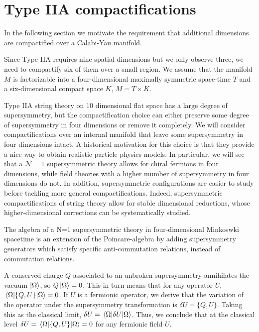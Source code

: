 \chapter{Type IIA compactifications}

In the following section we motivate the requirement that additional dimensions are compactified
over a Calabi-Yau manifold.

Since Type IIA requires nine spatial dimensions but we only observe three, we need to compactify six of 
them over a small region.
We assume that the manifold $M$ is factorizable into a four-dimensional maximally symmetric space-time $T$ and a six-dimensional compact space $K$,
$M =  T\times K$.

Type IIA string theory on 10 dimensional flat space has a large degree of supersymmetry,
but the compactification choice can either preserve some degree of supersymmetry in four dimensions or remove it completely.
We will consider compactifications over an internal manifold that leave some supersymmetry in four dimensions intact.
A historical motivation for this choice is that they provide a nice way to obtain realistic particle 
physics models. 
In particular, we will see that a $\mathcal N=1$ supersymmetric theory allows for chiral fermions in four dimensions, while field theories with a higher mumber of supersymmetry in four dimensions do not.
In addition, supersymmetric configurations are easier to study before tackling more general compactifications.
Indeed, supersymmetric compactifications of string theory allow  for stable dimensional reductions, whose higher-dimensional corrections can be systematically studied.

The algebra of a N=1 supersymmetric theory in four-dimensional Minkoswki spacetime is an extension of the Poincare-algebra by adding
 supersymmetry generators which satisfy specific anti-commutation relations, instead of commutation relations. 

A conserved charge $Q$ associated to an unbroken supersymmetry annihilates the vacuum $\ket{\Omega}$,
so $Q\ket{\Omega}=0$.
This in turn means that for any operator $U$, $\ev{ \{Q,U\} }{\Omega}=0$.
If $U$ is a fermionic operator, we derive that the variation of the operator under the supersymmetry
transformation is $\delta U = \{ Q, U\}$.
Taking this as the classical limit, $\delta U = \ev{\delta U}{\Omega}$.
Thus, we conclude that at the classical level $\delta U =\ev{ \{Q,U\} }{\Omega}= 0$ for any fermionic field $U$.

